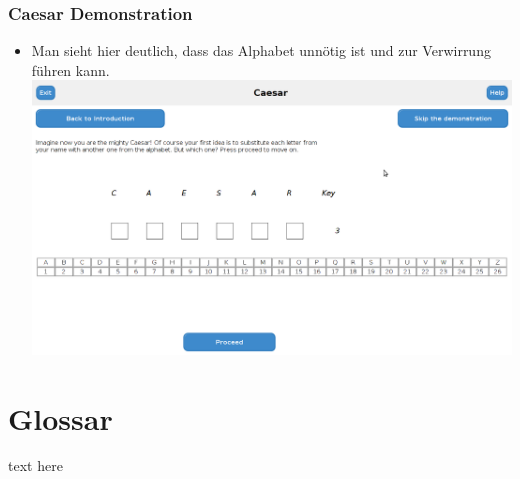\documentclass{article}
\begin{document}
	   \subsubsection{Caesar Demonstration}
	    \begin{itemize}
	     \item Man sieht hier deutlich, dass das Alphabet unnötig ist und zur Verwirrung führen kann.\newline
	           \includegraphics[width=15cm]{resources/caesarDemoUsability.png}
	    \end{itemize}


\section{Glossar}
text here

 \restoregeometry

\glsaddall
\printglossary[numberedsection, style=altlist]
\end{document}
